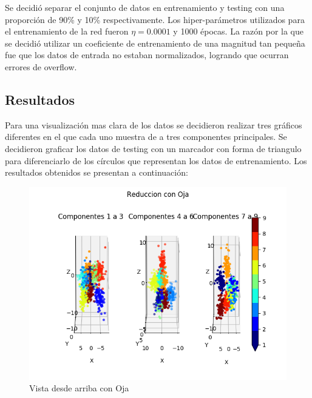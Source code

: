 Se decidió separar el conjunto de datos en entrenamiento y testing con una
proporción de 90\% y 10\% respectivamente. Los hiper-parámetros utilizados para
el entrenamiento de la red fueron $\eta = 0.0001$ y 1000 épocas. La razón por
la que se decidió utilizar un coeficiente de entrenamiento de una magnitud tan
pequeña fue que los datos de entrada no estaban normalizados, logrando que
ocurran errores de overflow.

\subsection{Resultados}
Para una visualización mas clara de los datos se decidieron realizar tres
gráficos diferentes en el que cada uno muestra de a tres componentes
principales. Se decidieron graficar los datos de testing con un marcador con
forma de triangulo para diferenciarlo de los círculos que representan los datos
de entrenamiento. Los resultados obtenidos se presentan a continuación:


\begin{figure}[H]
  \includegraphics[width=160mm]{imagenes/componentes_oja_1.png}
  \caption{Vista desde arriba con Oja}
\end{figure}

